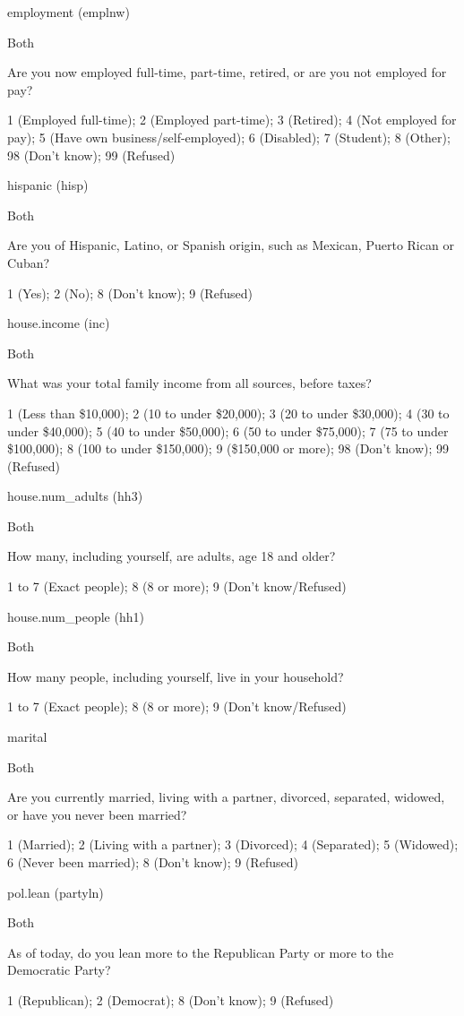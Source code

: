 \documentclass[]{book}
\begin{document}
employment (emplnw)

Both

Are you now employed full-time, part-time, retired, or are you not
employed for pay?

1 (Employed full-time); 2 (Employed part-time); 3 (Retired); 4 (Not
employed for pay); 5 (Have own business/self-employed); 6 (Disabled); 7
(Student); 8 (Other); 98 (Don't know); 99 (Refused)

hispanic (hisp)

Both

Are you of Hispanic, Latino, or Spanish origin, such as Mexican, Puerto
Rican or Cuban?

1 (Yes); 2 (No); 8 (Don't know); 9 (Refused)

house.income (inc)

Both

What was your total family income from all sources, before taxes?

1 (Less than \$10,000); 2 (10 to under \$20,000); 3 (20 to under
\$30,000); 4 (30 to under \$40,000); 5 (40 to under \$50,000); 6 (50 to
under \$75,000); 7 (75 to under \$100,000); 8 (100 to under \$150,000);
9 (\$150,000 or more); 98 (Don't know); 99 (Refused)

house.num\_adults (hh3)

Both

How many, including yourself, are adults, age 18 and older?

1 to 7 (Exact people); 8 (8 or more); 9 (Don't know/Refused)

house.num\_people (hh1)

Both

How many people, including yourself, live in your household?

1 to 7 (Exact people); 8 (8 or more); 9 (Don't know/Refused)

marital

Both

Are you currently married, living with a partner, divorced, separated,
widowed, or have you never been married?

1 (Married); 2 (Living with a partner); 3 (Divorced); 4 (Separated); 5
(Widowed); 6 (Never been married); 8 (Don't know); 9 (Refused)

pol.lean (partyln)

Both

As of today, do you lean more to the Republican Party or more to the
Democratic Party?

1 (Republican); 2 (Democrat); 8 (Don't know); 9 (Refused)
\end{document}
